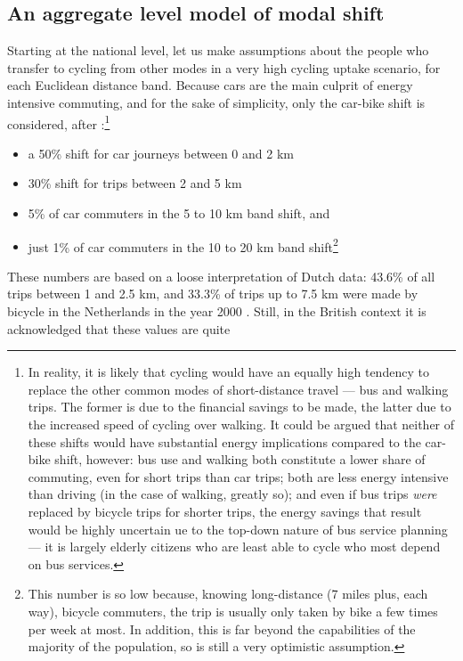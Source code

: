 \documentclass[a4paper, 11pt, twoside]{Thesis}
\begin{document}
\subsection{An aggregate level model of modal shift}
Starting at the national level, let us make assumptions about the people who
transfer to cycling from other modes in a very high cycling uptake scenario,
for each Euclidean distance band. Because cars are the main culprit of energy
intensive commuting, and for the sake of simplicity, only the car-bike shift is
considered, after \citet{Lovelace2011-assessing}:\footnote{In
reality, it is likely that cycling
would have an equally high tendency to replace the other common modes of
short-distance travel --- bus
\citet{dorling2013population} and walking trips. The former is due to the
financial savings to be made, the latter due to the increased speed of cycling
over walking. It could be argued that neither of these shifts would have
substantial energy implications compared to the car-bike shift, however: bus
use and walking both constitute a lower share of commuting, even for short
trips than car trips; both are less energy intensive than driving (in the case
of walking, greatly so); and even if bus trips \emph{were} replaced by bicycle
trips for shorter trips, the energy savings that result would be highly
uncertain ue to the top-down nature of bus service planning --- it is largely
elderly citizens who are least able to cycle who most depend on bus services.
}
\begin{itemize} 
 \item a 50\% shift for car journeys between 0 and 2 km
 \item 30\% shift for trips between 2 and 5 km
 \item 5\% of car commuters in the 5 to 10 km band shift, and
 \item just 1\% of car commuters in the 10 to 20 km band
 shift\footnote{This
 number is so low because, knowing long-distance (7 miles plus, each way),
 bicycle commuters, the trip is usually only taken by bike a few times per week
at most. In addition, this is far beyond the capabilities of the majority of
the population, so is still a very optimistic assumption.
}
\end{itemize}
These numbers are based on a loose interpretation of Dutch data: 43.6\% of
all trips between
1 and 2.5 km, and 33.3\% of trips up to 7.5 km were made by bicycle in the
Netherlands in the year 2000 \citep{Rietveld2004}.
Still, in the British context it is acknowledged that these values are quite
\end{document}
